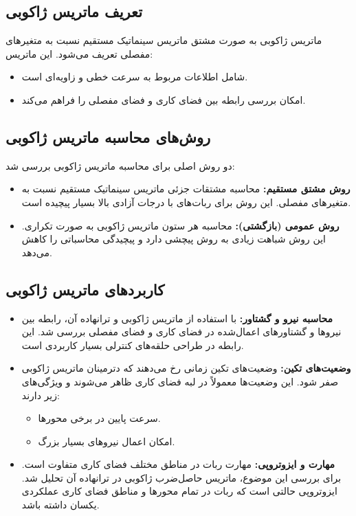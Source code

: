 \subsection*{تعریف ماتریس ژاکوبی}
ماتریس ژاکوبی به صورت مشتق ماتریس سینماتیک مستقیم نسبت به متغیرهای مفصلی تعریف می‌شود. این ماتریس:
\begin{itemize}
	\item شامل اطلاعات مربوط به سرعت خطی و زاویه‌ای است.
	\item امکان بررسی رابطه بین فضای کاری و فضای مفصلی را فراهم می‌کند.
\end{itemize}

\subsection*{روش‌های محاسبه ماتریس ژاکوبی}
دو روش اصلی برای محاسبه ماتریس ژاکوبی بررسی شد:
\begin{itemize}
	\item \textbf{روش مشتق مستقیم:} محاسبه مشتقات جزئی ماتریس سینماتیک مستقیم نسبت به متغیرهای مفصلی. این روش برای ربات‌های با درجات آزادی بالا بسیار پیچیده است.
	\item \textbf{روش عمومی (بازگشتی):} محاسبه هر ستون ماتریس ژاکوبی به صورت تکراری. این روش شباهت زیادی به روش پیچشی دارد و پیچیدگی محاسباتی را کاهش می‌دهد.
\end{itemize}

\subsection*{کاربردهای ماتریس ژاکوبی}
\begin{itemize}
	\item \textbf{محاسبه نیرو و گشتاور:} با استفاده از ماتریس ژاکوبی و ترانهاده آن، رابطه بین نیروها و گشتاورهای اعمال‌شده در فضای کاری و فضای مفصلی بررسی شد. این رابطه در طراحی حلقه‌های کنترلی بسیار کاربردی است.
	\item \textbf{وضعیت‌های تکین:} وضعیت‌های تکین زمانی رخ می‌دهند که دترمینان ماتریس ژاکوبی صفر شود. این وضعیت‌ها معمولاً در لبه فضای کاری ظاهر می‌شوند و ویژگی‌های زیر دارند:
	\begin{itemize}
		\item سرعت پایین در برخی محورها.
		\item امکان اعمال نیروهای بسیار بزرگ.
	\end{itemize}
	\item \textbf{مهارت و ایزوتروپی:} مهارت ربات در مناطق مختلف فضای کاری متفاوت است. برای بررسی این موضوع، ماتریس حاصل‌ضرب ژاکوبی در ترانهاده آن تحلیل شد. ایزوتروپی حالتی است که ربات در تمام محورها و مناطق فضای کاری عملکردی یکسان داشته باشد.
\end{itemize}

